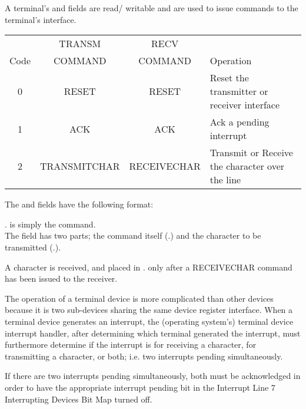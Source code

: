 A terminal’s  and  fields are read/ writable and are used to issue commands to the terminal’s interface.

\begin{center}
	\begin{tabular}{|c|c|c|>{\centering\arraybackslash}p{6cm}|}
		\hline
		& TRANSM & RECV & \\
		Code & COMMAND & COMMAND & Operation \\
		\hline
		\hline
		0 & RESET & RESET & Reset the transmitter or receiver interface\\
		\hline
		1 & ACK & ACK & Ack a pending interrupt\\
		\hline
		2 & TRANSMITCHAR & RECEIVECHAR & Transmit or Receive the character over the line\\
		\hline
	\end{tabular}
\end{center}

The  and  fields have the following format:


. is simply the command.\\
The  field has two parts; the command itself \linebreak(.) and the character to be transmitted \linebreak(.).

A character is received, and placed in . only after a RECEIVECHAR command has been issued to the receiver.


The operation of a terminal device is more complicated than other devices because it is two sub-devices sharing the same device register interface. 
When a terminal device generates an interrupt, the (operating system’s) terminal device interrupt handler, after determining which terminal generated the interrupt, must furthermore determine if the interrupt is for receiving a character, for transmitting a character, or both; i.e. two interrupts pending simultaneously.

If there are two interrupts pending simultaneously, both must be acknowledged in order to have the appropriate interrupt pending bit in the Interrupt Line 7 Interrupting Devices Bit Map turned off.

